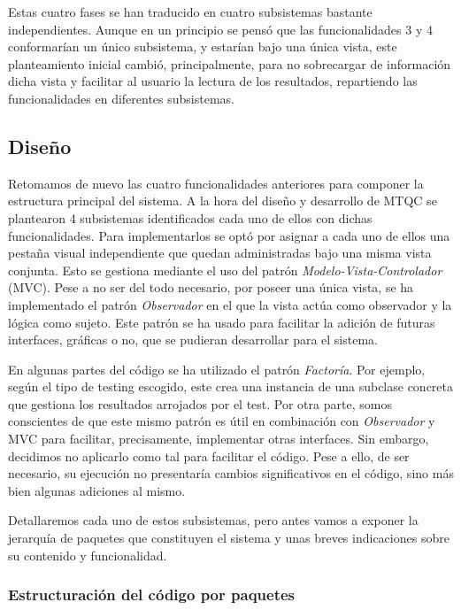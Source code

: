 Estas cuatro fases se han traducido en cuatro subsistemas bastante independientes. Aunque en un principio se pensó que las funcionalidades $3$ y $4$ conformarían un único subsistema, y estarían bajo una única vista, este planteamiento inicial cambió, principalmente, para no sobrecargar de información dicha vista y facilitar al usuario la lectura de los resultados, repartiendo las funcionalidades en diferentes subsistemas.

\subsection{Diseño}

Retomamos de nuevo las cuatro funcionalidades anteriores para componer la estructura principal del sistema. A la hora del diseño y desarrollo de MTQC se plantearon 4 subsistemas identificados cada uno de ellos con dichas funcionalidades.
%
Para implementarlos se optó por asignar a cada uno de ellos una pestaña visual independiente que quedan administradas bajo una misma vista conjunta. Esto se gestiona mediante el uso del patrón \textit{Modelo-Vista-Controlador} (MVC). Pese a no ser del todo necesario, por poseer una única vista, se ha implementado el patrón \textit{Observador} en el que la vista actúa como observador y la lógica como sujeto. Este patrón se ha usado para facilitar la adición de futuras interfaces, gráficas o no, que se pudieran desarrollar para  el sistema.

En algunas partes del código se ha  utilizado el patrón \textit{Factoría}. Por ejemplo, según el tipo de testing escogido, este crea una instancia de una subclase concreta que gestiona los resultados arrojados por el test. Por otra parte, somos conscientes de que este mismo patrón es útil en combinación con \textit{Observador} y MVC para facilitar, precisamente, implementar otras interfaces. Sin embargo, decidimos no aplicarlo como tal para facilitar el código. Pese a ello, de ser necesario, su ejecución no presentaría cambios significativos en el código, sino más bien algunas adiciones al mismo.

Detallaremos cada uno de estos subsistemas, pero antes vamos a exponer la jerarquía de paquetes que constituyen el sistema y unas breves indicaciones sobre su contenido y funcionalidad.

\subsubsection{Estructuración del código por paquetes}

